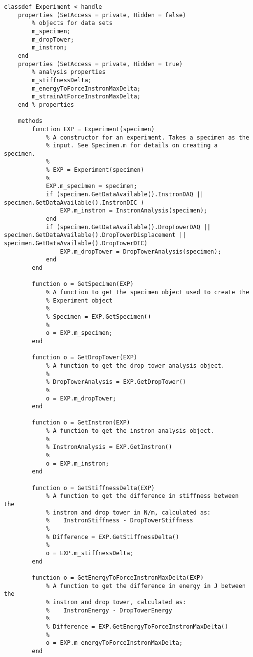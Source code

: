 \begin{lstlisting}
classdef Experiment < handle
    properties (SetAccess = private, Hidden = false)
        % objects for data sets
        m_specimen;
        m_dropTower;
        m_instron;
    end
    properties (SetAccess = private, Hidden = true)
        % analysis properties
        m_stiffnessDelta;
        m_energyToForceInstronMaxDelta;
        m_strainAtForceInstronMaxDelta;
    end % properties
    
    methods
        function EXP = Experiment(specimen)
            % A constructor for an experiment. Takes a specimen as the
            % input. See Specimen.m for details on creating a specimen.
            %
            % EXP = Experiment(specimen)
            %
            EXP.m_specimen = specimen;
            if (specimen.GetDataAvailable().InstronDAQ || specimen.GetDataAvailable().InstronDIC )
                EXP.m_instron = InstronAnalysis(specimen);
            end
            if (specimen.GetDataAvailable().DropTowerDAQ || specimen.GetDataAvailable().DropTowerDisplacement || specimen.GetDataAvailable().DropTowerDIC)
                EXP.m_dropTower = DropTowerAnalysis(specimen);
            end
        end
        
        function o = GetSpecimen(EXP)
            % A function to get the specimen object used to create the
            % Experiment object
            %
            % Specimen = EXP.GetSpecimen()
            %
            o = EXP.m_specimen;
        end
        
        function o = GetDropTower(EXP)
            % A function to get the drop tower analysis object.
            %
            % DropTowerAnalysis = EXP.GetDropTower()
            %
            o = EXP.m_dropTower;
        end
        
        function o = GetInstron(EXP)
            % A function to get the instron analysis object.
            %
            % InstronAnalysis = EXP.GetInstron()
            %
            o = EXP.m_instron;
        end
        
        function o = GetStiffnessDelta(EXP)
            % A function to get the difference in stiffness between the
            % instron and drop tower in N/m, calculated as:
            %    InstronStiffness - DropTowerStiffness
            %
            % Difference = EXP.GetStiffnessDelta()
            %
            o = EXP.m_stiffnessDelta;
        end
        
        function o = GetEnergyToForceInstronMaxDelta(EXP)
            % A function to get the difference in energy in J between the
            % instron and drop tower, calculated as:
            %    InstronEnergy - DropTowerEnergy
            %
            % Difference = EXP.GetEnergyToForceInstronMaxDelta()
            %
            o = EXP.m_energyToForceInstronMaxDelta;
        end
        

\end{lstlisting}
